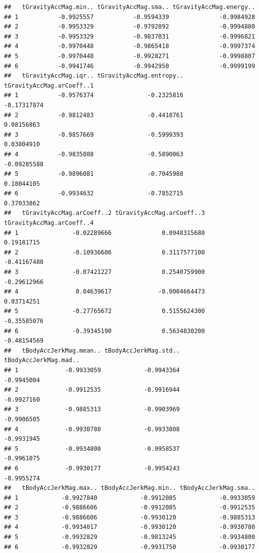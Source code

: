 \documentclass[
]{article}
\begin{document}
\begin{verbatim}
##   tGravityAccMag.min.. tGravityAccMag.sma.. tGravityAccMag.energy..
## 1           -0.9925557           -0.9594339              -0.9984928
## 2           -0.9953329           -0.9792892              -0.9994880
## 3           -0.9953329           -0.9837031              -0.9996821
## 4           -0.9970448           -0.9865418              -0.9997374
## 5           -0.9970448           -0.9928271              -0.9998807
## 6           -0.9941746           -0.9942950              -0.9999199
##   tGravityAccMag.iqr.. tGravityAccMag.entropy.. tGravityAccMag.arCoeff..1
## 1           -0.9576374               -0.2325816               -0.17317874
## 2           -0.9812483               -0.4418761                0.08156863
## 3           -0.9857669               -0.5999393                0.03804910
## 4           -0.9835088               -0.5890063               -0.09285588
## 5           -0.9896081               -0.7045988                0.18044105
## 6           -0.9934632               -0.7852715                0.37033862
##   tGravityAccMag.arCoeff..2 tGravityAccMag.arCoeff..3 tGravityAccMag.arCoeff..4
## 1               -0.02289666              0.0948315680                0.19181715
## 2               -0.10936606              0.3117577100               -0.41167480
## 3               -0.07421227              0.2540759900               -0.29612966
## 4                0.04639617             -0.0004664473                0.03714251
## 5               -0.27765672              0.5155624300               -0.35585076
## 6               -0.39345190              0.5634830200               -0.48154569
##   tBodyAccJerkMag.mean.. tBodyAccJerkMag.std.. tBodyAccJerkMag.mad..
## 1             -0.9933059            -0.9943364            -0.9945004
## 2             -0.9912535            -0.9916944            -0.9927160
## 3             -0.9885313            -0.9903969            -0.9906505
## 4             -0.9930780            -0.9933808            -0.9931945
## 5             -0.9934800            -0.9958537            -0.9961075
## 6             -0.9930177            -0.9954243            -0.9955274
##   tBodyAccJerkMag.max.. tBodyAccJerkMag.min.. tBodyAccJerkMag.sma..
## 1            -0.9927840            -0.9912085            -0.9933059
## 2            -0.9886606            -0.9912085            -0.9912535
## 3            -0.9886606            -0.9930120            -0.9885313
## 4            -0.9934017            -0.9930120            -0.9930780
## 5            -0.9932829            -0.9813245            -0.9934800
## 6            -0.9932829            -0.9931750            -0.9930177

\end{verbatim}
\end{document}
